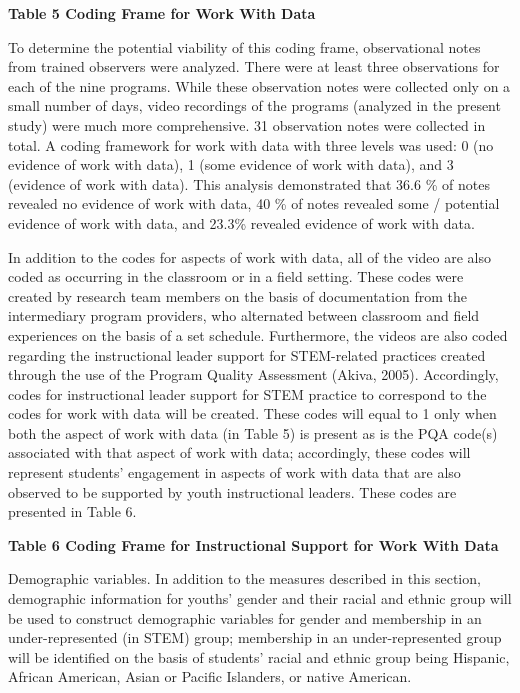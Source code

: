 \documentclass[]{book}
\theoremstyle{definition}
\theoremstyle{definition}
\theoremstyle{definition}
\theoremstyle{remark}
\begin{document}
\textbf{Table 5 Coding Frame for Work With Data}

To determine the potential viability of this coding frame, observational
notes from trained observers were analyzed. There were at least three
observations for each of the nine programs. While these observation
notes were collected only on a small number of days, video recordings of
the programs (analyzed in the present study) were much more
comprehensive. 31 observation notes were collected in total. A coding
framework for work with data with three levels was used: 0 (no evidence
of work with data), 1 (some evidence of work with data), and 3 (evidence
of work with data). This analysis demonstrated that 36.6 \% of notes
revealed no evidence of work with data, 40 \% of notes revealed some /
potential evidence of work with data, and 23.3\% revealed evidence of
work with data.

In addition to the codes for aspects of work with data, all of the video
are also coded as occurring in the classroom or in a field setting.
These codes were created by research team members on the basis of
documentation from the intermediary program providers, who alternated
between classroom and field experiences on the basis of a set schedule.
Furthermore, the videos are also coded regarding the instructional
leader support for STEM-related practices created through the use of the
Program Quality Assessment (Akiva, 2005). Accordingly, codes for
instructional leader support for STEM practice to correspond to the
codes for work with data will be created. These codes will equal to 1
only when both the aspect of work with data (in Table 5) is present as
is the PQA code(s) associated with that aspect of work with data;
accordingly, these codes will represent students' engagement in aspects
of work with data that are also observed to be supported by youth
instructional leaders. These codes are presented in Table 6.

\textbf{Table 6 Coding Frame for Instructional Support for Work With
Data}

Demographic variables. In addition to the measures described in this
section, demographic information for youths' gender and their racial and
ethnic group will be used to construct demographic variables for gender
and membership in an under-represented (in STEM) group; membership in an
under-represented group will be identified on the basis of students'
racial and ethnic group being Hispanic, African American, Asian or
Pacific Islanders, or native American.
\end{document}
